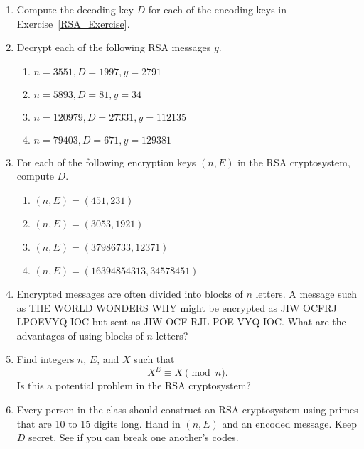 {\begin{enumerate}
\begin{enumerate}
\item
$n = 120979, E = 13251, x = 142371$
 
\item
$n = 45629, E = 781, x = 231561$
 

 \end{enumerate}

 
 
\item
Compute the decoding key $D$ for each of the encoding keys in
Exercise~\ref{RSA_Exercise}. 
 
 
\item
Decrypt each of the following RSA messages $y$.
\begin{enumerate}
 
 
\item
$n = 3551, D = 1997, y = 2791$

\item
$n = 5893, D = 81, y = 34$
 
\item
$n = 120979, D = 27331, y = 112135$
 
\item
$n = 79403, D = 671, y = 129381$
 
\end{enumerate}

 

 
\item
For each of the following encryption keys $(n, E)$ in the RSA
cryptosystem, compute $D$.
\begin{enumerate}
 
 \item
$(n, E) = (451, 231)$

 
 \item
$(n, E) = (3053, 1921)$
 
 \item
$(n, E) = (37986733, 12371)$
 
 \item
$(n, E) = (16394854313, 34578451)$
 
\end{enumerate}

 
 
  
 
\item
Encrypted messages are often divided into blocks of $n$ letters. A
message such as THE WORLD WONDERS WHY might be encrypted as 
JIW OCFRJ LPOEVYQ IOC but sent as JIW OCF RJL POE VYQ
IOC.  What are the advantages of using blocks of $n$ letters? 
 
 
\item
Find integers $n$, $E$, and $X$ such that
\[
X^E \equiv X \pmod{n}.
\]
Is this a potential problem in the RSA cryptosystem?
 
 
\item
Every person in the class should construct an RSA cryptosystem using primes
that are 10 to 15 digits long.  Hand in $(n, E)$ and an encoded 
message. Keep $D$ secret. See if you can break one another's codes.
 
 
\end{enumerate}
}
 
